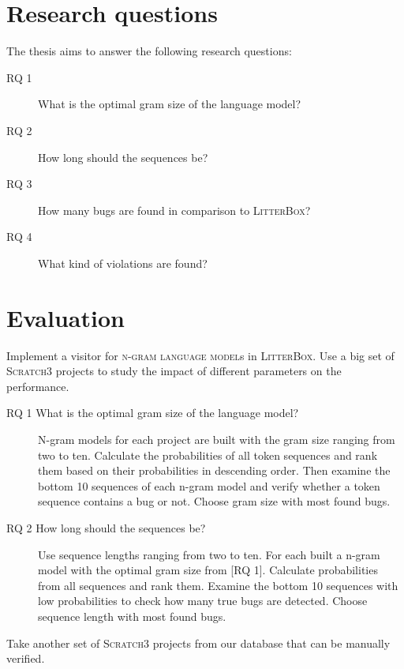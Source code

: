 \documentclass[
    numbers=noenddot,
    parskip=half-,
    fontsize=12pt,
    paper=a4,
    oneside,
    titlepage,
    bibliography=totoc,
    chapterprefix=false,
]{scrbook}
\newcommand{\ngram}{\textsc{n-gram language model}}
\newcommand{\litterbox}{\textsc{LitterBox}}
\newcommand{\scratch}{\textsc{Scratch}}
\begin{document}
    \chapter{Research questions}\label{ch:research-questions}
    The thesis aims to answer the following research questions:

    \begin{description}
        \item[RQ 1] What is the optimal gram size of the language model?
        \item[RQ 2] How long should the sequences be?
        \item[RQ 3] How many bugs are found in comparison to \litterbox{}?
        \item[RQ 4] What kind of violations are found?
    \end{description}


    \chapter{Evaluation}\label{ch:evaluation}
    
    Implement a visitor for \ngram{s} in \litterbox{}. Use a big set of \scratch{3} projects to study the impact of different parameters on the performance.  
    
    \begin{description}
        \item[RQ 1 What is the optimal gram size of the language model?] N-gram models for each project are built with the gram size ranging from two to ten. Calculate the probabilities of all token sequences and rank them based on their probabilities in descending order. Then examine the bottom 10 sequences of each n-gram model and verify whether a token sequence contains a bug or not. Choose gram size with most found bugs.
        \item[RQ 2 How long should the sequences be?]
        Use sequence lengths ranging from two to ten. For each built a n-gram model with the optimal gram size from [RQ 1]. Calculate probabilities from all sequences and rank them. 
        Examine the bottom 10 sequences with low probabilities to check how many true bugs are detected. Choose sequence length with most found bugs.
    \end{description}


	Take another set of \scratch{3} projects from our database that can be manually verified.
	
\end{document}

